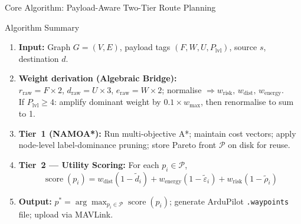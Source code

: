 \documentclass[aspectratio=169,11pt]{beamer}
\begin{document}
\begin{frame}{Core Algorithm: Payload-Aware Two-Tier Route Planning}
  \begin{block}{Algorithm Summary}
    \begin{enumerate}
      \item \textbf{Input:} Graph $G=(V,E)$, payload tags
            $(F,W,U,P_\mathrm{lvl})$, source $s$, destination $d$.
      \item \textbf{Weight derivation (Algebraic Bridge):}\\
            $r_\mathrm{raw}{=}F{\times}2$,\quad
            $d_\mathrm{raw}{=}U{\times}3$,\quad
            $e_\mathrm{raw}{=}W{\times}2$;\quad
            normalise $\Rightarrow w_\mathrm{risk},\,w_\mathrm{dist},\,w_\mathrm{energy}$.\\
            If $P_\mathrm{lvl}\geq4$: amplify dominant weight by
            $0.1{\times}w_\mathrm{max}$, then renormalise to sum to 1.
      \item \textbf{Tier~1 (NAMOA*):} Run multi-objective A*;
            maintain cost vectors; apply node-level label-dominance pruning;
            store Pareto front $\mathcal{P}$ on disk for reuse.
      \item \textbf{Tier~2 --- Utility Scoring:} For each $p_i\in\mathcal{P}$,
            \[
              \operatorname{score}(p_i)=
                w_\mathrm{dist}(1-\tilde{d}_i)
                +w_\mathrm{energy}(1-\tilde{\varepsilon}_i)
                +w_\mathrm{risk}(1-\tilde{\rho}_i)
            \]
      \item \textbf{Output:}
            $p^*=\arg\max_{p_i\in\mathcal{P}}\operatorname{score}(p_i)$;
            generate ArduPilot \texttt{.waypoints} file; upload via MAVLink.
    \end{enumerate}
  \end{block}
\end{frame}
\end{document}
